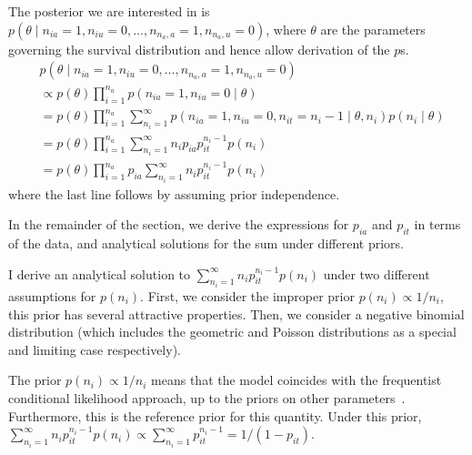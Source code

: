 \documentclass[thesis.tex]{subfiles}
\begin{document}
The posterior we are interested in is
$p(\theta \mid n_{ia} = 1, n_{iu} = 0, \dots, n_{n_a,a} = 1, n_{n_a,u} = 0)$,
where $\theta$ are the parameters governing the survival distribution
and hence allow derivation of the $p$s.
\begin{align}
&p(\theta \mid n_{ia} = 1, n_{iu} = 0, \dots, n_{n_a,a} = 1, n_{n_a,u} = 0) \\
&\propto p(\theta) \prod_{i=1}^{n_a} p(n_{ia} = 1, n_{iu} = 0 \mid \theta) \\
&= p(\theta) \prod_{i=1}^{n_a} \sum_{n_i=1}^\infty p(n_{ia} = 1, n_{iu} = 0, n_{it} = n_i - 1 \mid \theta, n_i) p(n_i \mid \theta) \\
&= p(\theta) \prod_{i=1}^{n_a} \sum_{n_i=1}^\infty n_i p_{ia} p_{it}^{n_i- 1} p(n_i) \\
&= p(\theta) \prod_{i=1}^{n_a} p_{ia} \sum_{n_i=1}^\infty n_i p_{it}^{n_i- 1} p(n_i)
\end{align}
where the last line follows by assuming prior independence.

In the remainder of the section, we derive the expressions for $p_{ia}$ and
$p_{it}$ in terms of the data, and analytical solutions for the sum
under different priors.

I derive an analytical solution to $\sum_{n_i=1}^\infty n_i p_{it}^{n_i- 1} p(n_i)$ under two different assumptions for $p(n_i)$.
First, we consider the improper prior $p(n_i) \propto 1/n_i$, this prior has several attractive properties.
Then, we consider a negative binomial distribution (which includes the geometric and Poisson distributions as a special and limiting case respectively).

The prior $p(n_i) \propto 1/n_i$ means that the model coincides with the frequentist conditional likelihood approach, up to the priors on other parameters~\cites[section 4.2]{dempsterMaximum}{heiseyModelling}[section 8.7.5]{gelmanBayesian}.
Furthermore, this is the reference prior for this quantity\autocite{heBayesiana}.
Under this prior,
$\sum_{n_i=1}^\infty n_i p_{it}^{n_i- 1} p(n_i) \propto \sum_{n_i=1}^\infty p_{it}^{n_i-1} = 1/(1-p_{it})$.
\end{document}
